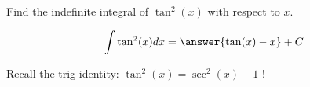\documentclass{ximera}
\author{Gregory Hartman \and Matthew Carr}
\begin{document}
\begin{exercise}

Find the indefinite integral of $\tan^{2}(x)$ with respect to $x$.

\[
\int \tan^2(x) dx=\answer{\tan(x)-x}+C
\]
\begin{hint}
Recall the trig identity: $\tan^2(x)=\sec^2(x)-1$ !
\end{hint}
\end{exercise}
\end{document}
